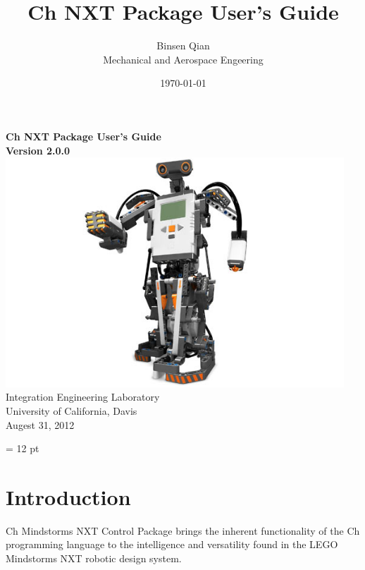 \documentclass[11pt]{article}
\title{Ch NXT Package User's Guide}
\author{Binsen Qian\\Mechanical and Aerospace Engeering}
\date{\today}
\begin{document}
\begin{titlepage}
    \begin{center}
        \vspace*{2cm}
        {\Huge\sf\bf Ch NXT Package User's Guide}\\
        \vspace*{2cm}
        {\bf Version 2.0.0}\\
        \vspace*{2cm}
        \includegraphics[width = 5in]{figure/mindstorm/NXT_humanoid.png}
        \vspace*{2cm}
        \newline
        Integration Engineering Laboratory\\
        University of California, Davis\\
        Augest 31, 2012\\
    \end{center}
\end{titlepage}

\newpage
\tableofcontents
\newpage
\baselineskip = 12 pt

\section{Introduction}
Ch Mindstorms NXT Control Package brings the inherent functionality of the Ch programming language
to the intelligence and versatility found in the LEGO Mindstorms NXT robotic design system.\\
\end{document}
